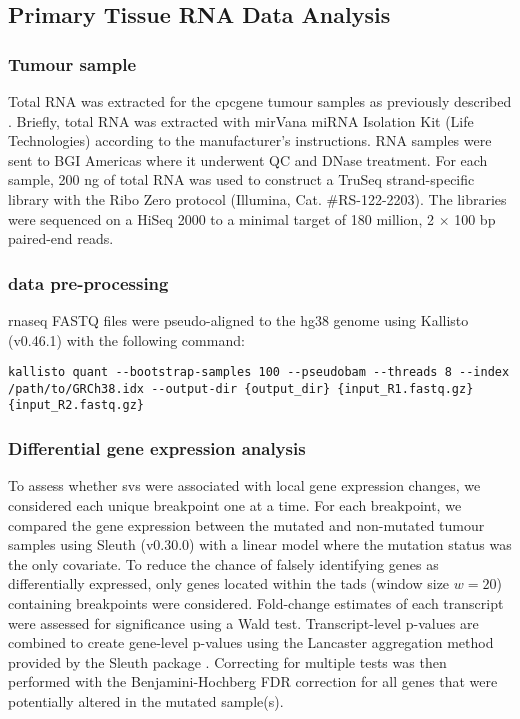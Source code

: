\subsection{Primary Tissue RNA Data Analysis}

\subsubsection{Tumour sample }

Total RNA was extracted for the \gls{cpcgene} tumour samples as previously described \cite{chenWidespreadFunctionalRNA2019}.
Briefly, total RNA was extracted with mirVana miRNA Isolation Kit (Life Technologies) according to the manufacturer's instructions.
RNA samples were sent to BGI Americas where it underwent QC and DNase treatment.
For each sample, 200 ng of total RNA was used to construct a TruSeq strand-specific library with the Ribo Zero protocol (Illumina, Cat. \#RS-122-2203).
The libraries were sequenced on a HiSeq 2000 to a minimal target of 180 million, 2 $\times$ 100 bp paired-end reads.

\subsubsection{ data pre-processing}

\gls{rnaseq} FASTQ files were pseudo-aligned to the hg38 genome using Kallisto (v0.46.1) \cite{brayNearoptimalProbabilisticRNAseq2016} with the following command:

\begin{lstlisting}[basicstyle=\ttfamily]
kallisto quant --bootstrap-samples 100 --pseudobam --threads 8 --index /path/to/GRCh38.idx --output-dir {output_dir} {input_R1.fastq.gz} {input_R2.fastq.gz}
\end{lstlisting}

\subsubsection{Differential gene expression analysis}

To assess whether \glspl{sv} were associated with local gene expression changes, we considered each unique breakpoint one at a time.
For each breakpoint, we compared the gene expression between the mutated and non-mutated tumour samples using Sleuth (v0.30.0) \cite{pimentelDifferentialAnalysisRNAseq2017,yiGenelevelDifferentialAnalysis2018} with a linear model where the mutation status was the only covariate.
To reduce the chance of falsely identifying genes as differentially expressed, only genes located within the \glspl{tad} (window size  $w = 20$) containing breakpoints were considered.
Fold-change estimates of each transcript were assessed for significance using a Wald test.
Transcript-level p-values are combined to create gene-level p-values using the Lancaster aggregation method provided by the Sleuth package \cite{yiGenelevelDifferentialAnalysis2018}.
Correcting for multiple tests was then performed with the Benjamini-Hochberg FDR correction for all genes that were potentially altered in the mutated sample(s).
